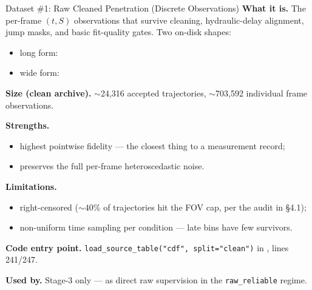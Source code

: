 \documentclass[UTF8,aspectratio=169]{ctexbeamer}
\newcommand{\good}[1]{\textcolor{green!45!black}{#1}}
\newcommand{\warn}[1]{\textcolor{red!65!black}{#1}}
\begin{document}
\begin{frame}{Dataset \#1: Raw Cleaned Penetration (Discrete Observations)}
\small
\textbf{What it is.} The per-frame \((t, S)\) observations that survive cleaning, hydraulic-delay alignment, jump masks, and basic fit-quality gates. Two on-disk shapes:
\begin{itemize}\setlength\itemsep{1.5pt}
  \item long form: 
  \item wide form: 
\end{itemize}

\vspace{0.35em}
\textbf{Size (clean archive).} \(\sim\)24{,}316 accepted trajectories, \(\sim\)703{,}592 individual frame observations.

\vspace{0.35em}
\textbf{Strengths.}
\begin{itemize}\setlength\itemsep{1.5pt}
  \item highest pointwise fidelity --- the closest thing to a measurement record;
  \item preserves the full per-frame heteroscedastic noise.
\end{itemize}

\textbf{Limitations.}
\begin{itemize}\setlength\itemsep{1.5pt}
  \item \warn{right-censored} (\(\sim 40\%\) of trajectories hit the FOV cap, per the audit in \S 4.1);
  \item non-uniform time sampling per condition --- late bins have few survivors.
\end{itemize}

\vspace{0.35em}
\textbf{Code entry point.} \texttt{load\_source\_table("cdf", split="clean")} in , lines 241/247.

\textbf{Used by.} Stage-3 only --- as \good{direct raw supervision} in the \texttt{raw\_reliable} regime.
\end{frame}
\end{document}
